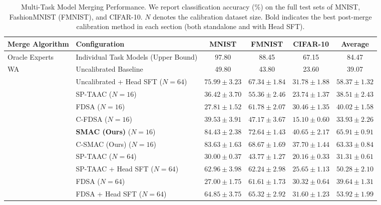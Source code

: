\documentclass{article}
\theoremstyle{plain}
\theoremstyle{definition}
\theoremstyle{remark}
\begin{document}
\begin{table}[!t]
\caption{Multi-Task Model Merging Performance. We report classification accuracy (\%) on the full test sets of MNIST, FashionMNIST (FMNIST), and CIFAR-10. $N$ denotes the calibration dataset size. Bold indicates the best post-merge calibration method in each section (both standalone and with Head SFT).}
\label{tab:main_results}
\vskip 0.10in
\begin{center}
\begin{scriptsize}
\renewcommand{\arraystretch}{0.82}
\setlength{\tabcolsep}{4pt}
\begin{sc}
\begin{tabular}{llcccc}
\toprule
Merge Algorithm & Configuration & MNIST & FMNIST & CIFAR-10 & Average \\
\midrule
Oracle Experts & Individual Task Models (Upper Bound) & 97.80 & 88.45 & 67.15 & 84.47 \\
\midrule
WA & Uncalibrated Baseline & 49.80 & 43.80 & 23.60 & 39.07 \\
                 & Uncalibrated + Head SFT ($N = 64$) & $75.99 \pm 3.23$ & $67.34 \pm 1.84$ & $31.78 \pm 1.88$ & $58.37 \pm 1.32$ \\
\cmidrule{2-6}
                 & SP-TAAC ($N = 16$) & $36.42 \pm 3.70$ & $55.36 \pm 2.46$ & $23.74 \pm 1.37$ & $38.51 \pm 2.43$ \\
                 & FDSA ($N = 16$) & $27.81 \pm 1.52$ & $61.78 \pm 2.07$ & $30.46 \pm 1.35$ & $40.02 \pm 1.58$ \\
                 & C-FDSA ($N = 16$) & $39.53 \pm 3.91$ & $47.17 \pm 3.67$ & $15.10 \pm 0.60$ & $33.93 \pm 2.26$ \\
                 & \textbf{SMAC (Ours)} ($N = 16$) & \textbf{$84.43 \pm 2.38$} & \textbf{$72.64 \pm 1.43$} & \textbf{$40.65 \pm 2.17$} & \textbf{$65.91 \pm 0.91$} \\
                 & C-SMAC (Ours) ($N = 16$) & $83.63 \pm 1.63$ & $68.67 \pm 1.69$ & $37.70 \pm 1.44$ & $63.33 \pm 0.84$ \\
\cmidrule{2-6}
                 & SP-TAAC ($N = 64$) & $30.00 \pm 0.37$ & $43.77 \pm 1.27$ & $20.16 \pm 0.33$ & $31.31 \pm 0.61$ \\
                 & SP-TAAC + Head SFT ($N = 64$) & $62.96 \pm 3.98$ & $62.24 \pm 2.98$ & $25.65 \pm 1.13$ & $50.28 \pm 2.10$ \\
                 & FDSA ($N = 64$) & $27.00 \pm 1.75$ & $61.61 \pm 1.73$ & $30.32 \pm 0.64$ & $39.64 \pm 1.31$ \\
                 & FDSA + Head SFT ($N = 64$) & $64.85 \pm 3.75$ & $65.32 \pm 2.92$ & $31.60 \pm 1.23$ & $53.92 \pm 1.99$ \\

\end{tabular}
\end{sc}
\end{scriptsize}
\end{center}
\end{table}
\end{document}
